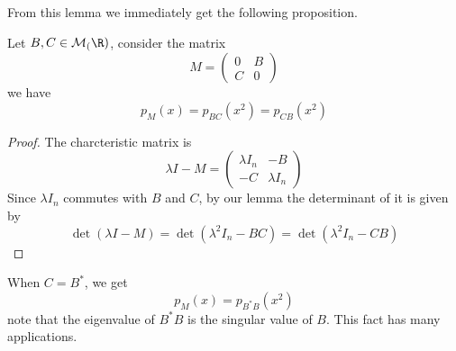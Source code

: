 From this lemma we immediately get the following proposition.
\begin{proposition}
Let $B,C\in\mathcal{M}_(\R)$, consider the matrix
\[M=\begin{pmatrix}
0&B\\
C&0
\end{pmatrix}\]
we have
\[p_M(x)=p_{BC}(x^2)=p_{CB}(x^2)\]
\end{proposition}
\begin{proof}
The charcteristic matrix is
\[\lambda I-M=\begin{pmatrix}
\lambda I_n&-B\\
-C&\lambda I_n
\end{pmatrix}\]
Since $\lambda I_n$ commutes with $B$ and $C$, by our lemma the determinant of it is given by
\[\det(\lambda I-M)=\det(\lambda^2I_n-BC)=\det(\lambda^2I_n-CB)\]
\end{proof}
\begin{remark}
When $C=B^*$, we get
\[p_M(x)=p_{B^*B}(x^2)\]
note that the eigenvalue of $B^*B$ is the singular value of $B$. This fact has many applications.
\end{remark}
